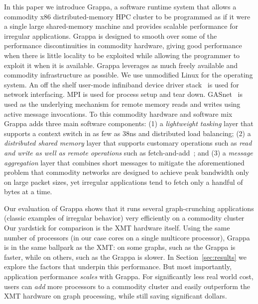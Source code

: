 In this paper we introduce Grappa, a software runtime system that allows
a commodity x86 distributed-memory HPC cluster to be programmed as if it
were a single large shared-memory machine and provides scalable
performance for irregular applications. Grappa is designed to smooth
over some of the performance discontinuities in commodity hardware,
giving good performance when there is little locality to be exploited
while allowing the programmer to exploit it when it is available. Grappa
leverages as much freely available and commodity infrastructure as
possible. We use unmodified Linux for the operating system. An off the
shelf user-mode infiniband device driver stack~\cite{Melonox?} is used
for network interfacing. MPI is used for process setup and
tear down. GASnet~\cite{gasnet:spec} is used as the underlying mechanism for
remote memory reads and writes using active message invocations. To this
commodity hardware and software mix Grappa adds three main software
components: (1) a \emph{lightweight tasking} layer that supports a
context switch in as few as 38ns and distributed load balancing; (2) a
\emph{distributed shared memory} layer that supports customary
operations such as \emph{read and write as well as remote operations}
such as fetch-and-add~\cite{fetchandadd}; and (3) a \emph{message
aggregation} layer that combines short messages to mitigate the
aforementioned problem that commodity networks are designed to achieve
peak bandwidth only on large packet sizes, yet irregular applications
tend to fetch only a handful of bytes at a time.


% 
% 

Our evaluation of Grappa shows that it runs several graph-crunching applications (classic examples of irregular behavior) very efficiently on a commodity cluster  Our yardstick for comparison is the XMT hardware itself.  Using the same number of processors (in our case cores on a single multicore processor), Grappa is in the same ballpark as the XMT: on some graphs, such as the  Grappa is  faster, while on others, such as the  Grappa is  slower.  In Section~\ref{sec:results} we explore the factors that underpin this performance.  But most importantly, application performance \emph{scales} with Grappa.  For significantly less real world cost, users can \emph{add} more processors to a commodity cluster and easily outperform the XMT hardware on graph processing, while still saving significant dollars.
% 


